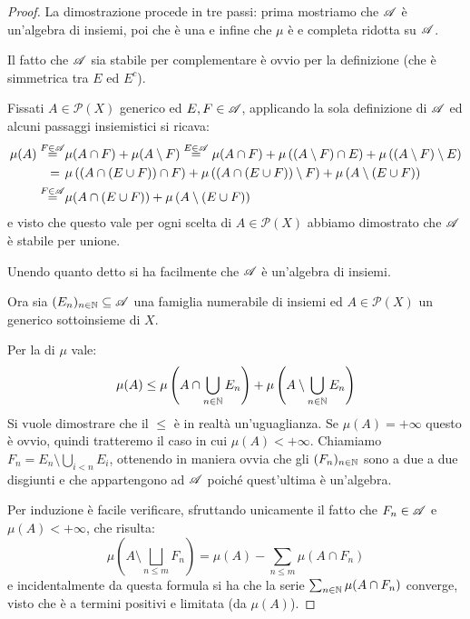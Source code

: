 \begin{proof}
	La dimostrazione procede in tre passi: prima mostriamo che $\mathscr A$ è un'algebra di insiemi, poi che è una \sigalg{} e infine che $\mu$ è \sigadd{} e completa ridotta su $\mathscr A$.
	
	Il fatto che $\mathscr A$ sia stabile per complementare è ovvio per la definizione (che è simmetrica tra $E$ ed $E^c$).
	
	Fissati $A\in\mathcal P(X)$ generico ed $E,F\in\mathscr A$, applicando la sola definizione di $\mathscr A$ ed alcuni passaggi insiemistici si ricava:
	\begin{align*}
		\mu(A)\stackrel{F\in\mathscr A}{=}&\mu(A\cap F)+\mu(A\setminus F)\stackrel{E\in\mathscr A}{=}
		\mu(A\cap F)+\mu\left((A\setminus F)\cap E\right)+\mu\left((A\setminus F)\setminus E\right)\\
		=\hspace{0.4em}&\mu\left((A\cap (E\cup F))\cap F\right)+\mu\left((A\cap (E\cup F))\setminus F\right)+
		\mu\left(A\setminus(E\cup F)\right)\\
		\stackrel{F\in\mathscr A}{=}&\mu(A\cap (E\cup F))+\mu\left(A\setminus(E\cup F)\right)
	\end{align*}
	e visto che questo vale per ogni scelta di $A\in\mathcal P(X)$ abbiamo dimostrato che $\mathscr A$ è stabile per unione.
	
	Unendo quanto detto si ha facilmente che $\mathscr A$ è un'algebra di insiemi.
	
	Ora sia $(E_n)_{n\in\mathbb N}\subseteq \mathscr A$ una famiglia numerabile di insiemi ed $A\in\mathcal P(X)$ un generico sottoinsieme di $X$.
	
	Per la \sigsubadd[ità] di $\mu$ vale:
	\begin{equation}\label{DisuguaglianzaFacileCaratheodory}
		\mu(A)\le \mu\left(A\cap\bigcup_{n\in\mathbb N} E_n\right)+\mu\left(A\setminus\bigcup_{n\in\mathbb N} E_n\right)
	\end{equation}
	Si vuole dimostrare che il $\le$ è in realtà un'uguaglianza. Se $\mu(A)=+\infty$ questo è ovvio, quindi tratteremo il caso in cui $\mu(A)<+\infty$. Chiamiamo $F_n=E_n\setminus \bigcup_{i<n} E_i$, ottenendo in maniera ovvia che gli $(F_n)_{n\in\mathbb N}$ sono a due a due disgiunti e che appartengono ad $\mathscr A$ poiché quest'ultima è un'algebra.
	
	Per induzione è facile verificare, sfruttando unicamente il fatto che $F_n\in\mathscr A$ e $\mu(A)<+\infty$, che risulta:
	\begin{equation}\label{IdentitaDifferenzaCaratheodory}
		\mu\left(A\setminus \bigsqcup_{n\le m} F_n\right)=\mu(A)-\sum_{n\le m} \mu(A\cap F_n)
	\end{equation}
	e incidentalmente da questa formula si ha che la serie $\sum_{n\in\mathbb N}\mu(A\cap F_n)$ converge, visto che è a termini positivi e limitata (da $\mu(A)$).
	

\end{proof}
